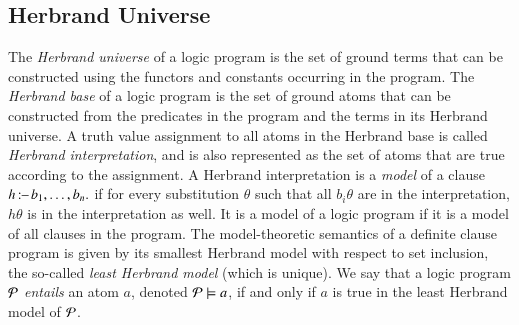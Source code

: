 \subsection{Herbrand Universe}

The \emph{Herbrand universe} of a logic program is the set of ground terms that can be constructed using the functors and constants occurring in the program.
The \emph{Herbrand base} of a logic program is the set of ground atoms that can be constructed from the predicates in the program and the terms in its Herbrand universe. 
A truth value assignment to all atoms in the 
Herbrand base is called \emph{Herbrand interpretation}, and is also represented as the set of atoms that are true according to the assignment. 
A Herbrand interpretation is a \emph{model} of a clause $h \operatorname*{\mathtt{{:}{\---}}} b_1,\ldots ,b_n\ldotp$ if for every substitution $\theta$ such that all $b_i\theta$ are in the interpretation, $h\theta$ is in the interpretation as well. It is a model of a logic program if it is a model of all clauses in the program. The model-theoretic semantics of a definite clause program is given by its smallest Herbrand model with respect to set inclusion, the so-called \emph{least Herbrand model} (which is unique). We say that a logic program $\mathcal{P}$ \emph{entails} an atom $a$, denoted $\mathcal{P}\models a$, if and only if $a$ is true in the least Herbrand model of $\mathcal{P}$.   







